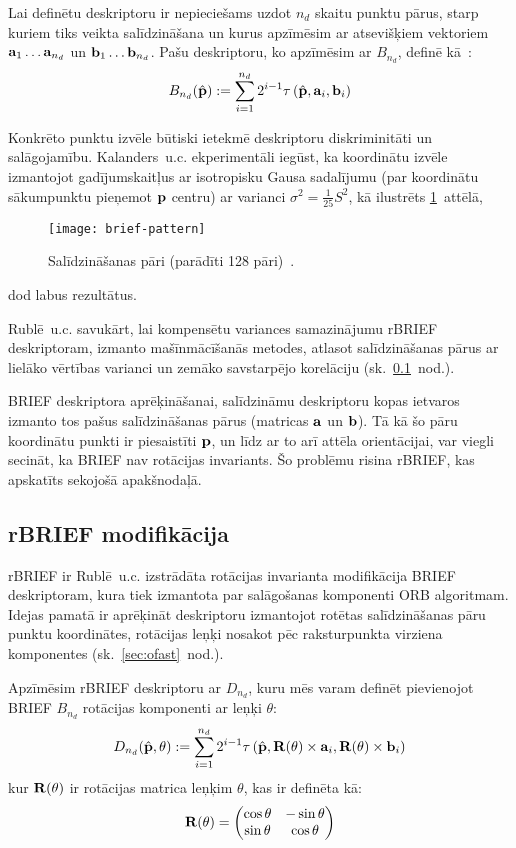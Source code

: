 Lai definētu deskriptoru ir nepieciešams uzdot $n_d$ skaitu punktu pārus,
starp kuriem tiks veikta salīdzināšana un
kurus apzīmēsim ar atsevišķiem vektoriem
$\mathbf{a}_1 \dots \mathbf{a}_{n_d}$ un $\mathbf{b}_1 \dots \mathbf{b}_{n_d}$.
Pašu deskriptoru, ko apzīmēsim ar $B_{n_d}$, definē kā~\cite{BRIEF}:
\begin{equation}
	B_{n_d}(\hat{\mathbf{p}}) := 
		\sum_{i=1}^{n_d} 2^{i-1} \tau\left(\hat{\mathbf{p}}, \mathbf{a}_i, \mathbf{b}_i\right)
\end{equation}

Konkrēto punktu izvēle būtiski ietekmē
deskriptoru diskriminitāti un salāgojamību. Kalanders~u.c.\cite{BRIEF}
ekperimentāli iegūst, ka koordinātu izvēle izmantojot gadījumskaitļus ar
isotropisku Gausa sadalījumu (par koordinātu sākumpunktu pieņemot
$\mathbf{p}$ centru) ar varianci $\sigma^2 = \frac{1}{25} S^2$, kā ilustrēts
\ref{fig:pattern1}~attēlā,
\begin{figure}[tbh]
	\centering
	\texttt{[image: brief-pattern]}
	\caption{Salīdzināšanas pāri (parādīti 128 pāri)~\cite{BRIEF}.}
	\label{fig:pattern1}
\end{figure}
dod labus rezultātus.

Rublē~u.c.\cite{ORB} savukārt, lai kompensētu variances samazinājumu rBRIEF
deskriptoram, izmanto mašīnmācīšanās metodes, atlasot
salīdzināšanas pārus ar lielāko vērtības varianci un zemāko savstarpējo
korelāciju (sk.~\ref{sec:rbrief-def}~nod.).

BRIEF deskriptora aprēķināšanai, salīdzināmu deskriptoru kopas ietvaros
izmanto tos pašus salīdzināšanas pārus (matricas $\mathbf{a}$ un $\mathbf{b}$).
Tā kā šo pāru koordinātu punkti ir piesaistīti $\mathbf{p}$, un līdz ar to arī
attēla orientācijai, var viegli secināt, ka BRIEF nav rotācijas invariants.
Šo problēmu risina rBRIEF, kas apskatīts sekojošā apakšnodaļā.

\subsection{rBRIEF modifikācija} \label{sec:rbrief-def}
rBRIEF ir Rublē~u.c.\cite{ORB} izstrādāta rotācijas invarianta modifikācija
BRIEF deskriptoram, kura tiek izmantota par salāgošanas komponenti ORB
algoritmam. Idejas pamatā ir aprēķināt deskriptoru izmantojot
rotētas salīdzināšanas pāru punktu koordinātes, rotācijas leņķi nosakot pēc
raksturpunkta virziena komponentes (sk.~\ref{sec:ofast}~nod.).

Apzīmēsim rBRIEF deskriptoru ar $D_{n_d}$, kuru mēs varam definēt
pievienojot BRIEF $B_{n_d}$ rotācijas komponenti ar leņķi $\theta$:
\begin{equation}\label{eq:rbrief}
	D_{n_d}(\hat{\mathbf{p}}, \theta) := \sum_{i=1}^{n_d} 2^{i-1}
		\tau\left(\hat{\mathbf{p}},
		          \mathbf{R}(\theta) \times \mathbf{a}_i,
		          \mathbf{R}(\theta) \times \mathbf{b}_i\right)
\end{equation}
kur $\mathbf{R}(\theta)$ ir rotācijas matrica leņķim $\theta$, kas ir definēta kā:
\[
	\mathbf{R}(\theta) = 
		\begin{pmatrix}
			\cos\theta & -\sin\theta\\
			\sin\theta & \cos\theta
		\end{pmatrix}
\]

